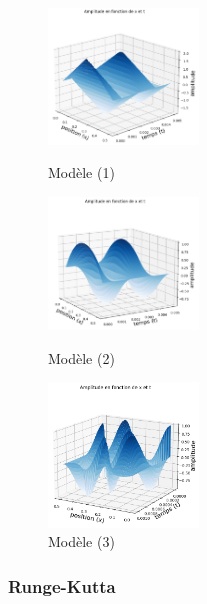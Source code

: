 \begin{figure}[H]
  \includegraphics[width=4cm]{3.png}
  \caption{Modèle (1)}\label{fig}
\endminipage\hfill
{}
  \includegraphics[width=4cm]{4.png}
  \caption{Modèle (2)}\label{fig}
\endminipage\hfill
{}%
  \includegraphics[width=4cm]{8_implicite.png}
  \caption{Modèle (3)}\label{fig}
\endminipage
\end{figure}


\subsubsection{Runge-Kutta}
   
